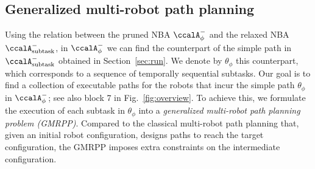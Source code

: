 \documentclass[Afour,sageh,times]{sagej}
\newtheorem{exmp}{Example}
\newcommand{\auto}[1]{\ccalA_{\textup{#1}}}
\newcommand{\autop}{\ccalA_{\phi}}
\newcommand{\vertex}[1]{v_{\textup{#1}}}
\newenvironment{cexmp}
{\addtocounter{exmp}{-1}\begin{exmp}}
  {\end{exmp}}
\begin{document}
{ %

 {\subsection{Generalized multi-robot path planning}\label{sec:mapp}
   Using  the relation between the pruned NBA  $\autop^-$ and the relaxed NBA $\auto{subtask}^-$, in $\autop^-$ we can find the counterpart  of the  simple path in $\auto{subtask}^-$ obtained in Section~\ref{sec:run}. We denote by $\theta_\phi$ this counterpart, which corresponds to  a sequence of temporally sequential subtasks. Our goal is to find a collection of executable paths for the robots that incur the simple path $\theta_\phi$ in $\autop^-$; see also block 7 in Fig.~\ref{fig:overview}. To achieve this, we formulate  the execution of each subtask in $\theta_\phi$ into a {\it generalized multi-robot path planning problem (GMRPP)}. Compared to the classical multi-robot path planning that, given an initial robot configuration, designs paths to reach the target configuration, the GMRPP imposes extra constraints on the intermediate configuration.

}}
\end{document}
